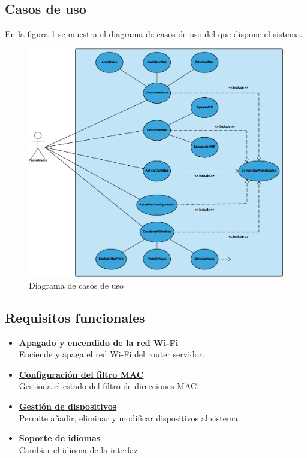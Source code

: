 \documentclass[12pt]{article}
\begin{document}
    \subsection{Casos de uso}
        En la figura \ref{fig:case_use_diagram} se muestra el diagrama de casos de uso del que dispone el sistema.
        \begin{figure}[h!]
        \centering
            \includegraphics[scale=0.35]{case_use_diagram.eps}
            \caption{Diagrama de casos de uso}
            \label{fig:case_use_diagram}
        \end{figure}
    
    \subsection{Requisitos funcionales}
        \begin{itemize}
            \item \textbf{\underline{Apagado y encendido de la red Wi-Fi}} \\
            Enciende y apaga el red Wi-Fi del router servidor. 
            \item \textbf{\underline{Configuración del filtro MAC}} \\
            Gestiona el estado del filtro de direcciones MAC.
            \item \textbf{\underline{Gestión de dispositivos}} \\
            Permite añadir, eliminar y modificar dispositivos al sistema.
            \item \textbf{\underline{Soporte de idiomas}} \\
            Cambiar el idioma de la interfaz.
        \end{itemize}
    
\end{document}
